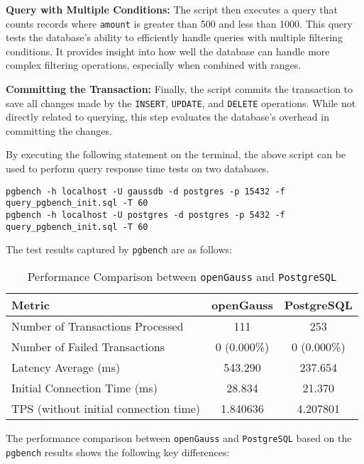 \documentclass[12pt,a4paper,cs4size]{ctexart}
\begin{document}
\textbf{Query with Multiple Conditions:} The script then executes a query that counts records where \texttt{amount} is greater than 500 and less than 1000. This query tests the database's ability to efficiently handle queries with multiple filtering conditions. It provides insight into how well the database can handle more complex filtering operations, especially when combined with ranges.

\textbf{Committing the Transaction:} Finally, the script commits the transaction to save all changes made by the \texttt{INSERT}, \texttt{UPDATE}, and \texttt{DELETE} operations. While not directly related to querying, this step evaluates the database's overhead in committing the changes.

\newpage

By executing the following statement on the terminal, the above script can be used to perform query response time tests on two databases.

\begin{lstlisting}[style=C++]
pgbench -h localhost -U gaussdb -d postgres -p 15432 -f query_pgbench_init.sql -T 60
pgbench -h localhost -U postgres -d postgres -p 5432 -f query_pgbench_init.sql -T 60
\end{lstlisting}

The test results captured by \texttt{pgbench} are as follows:

\begin{table}[h!]
\centering
\captionsetup{labelformat=empty}
\begin{tabular}{|l|c|c|}
\hline
\textbf{Metric} & \textbf{openGauss} & \textbf{PostgreSQL} \\
\hline
Number of Transactions Processed & 111 & 253 \\
\hline
Number of Failed Transactions & 0 (0.000\%) & 0 (0.000\%) \\
\hline
Latency Average (ms) & 543.290 & 237.654 \\
\hline
Initial Connection Time (ms) & 28.834 & 21.370 \\
\hline
TPS (without initial connection time) & 1.840636 & 4.207801 \\
\hline
\end{tabular}
\caption{Performance Comparison between \texttt{openGauss} and \texttt{PostgreSQL}}
\end{table}

The performance comparison between \texttt{openGauss} and \texttt{PostgreSQL} based on the \texttt{pgbench} results shows the following key differences:
\end{document}
